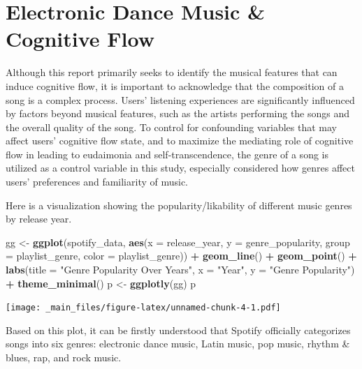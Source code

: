 \documentclass[
]{book}
\newenvironment{Shaded}{\begin{snugshade}}{\end{snugshade}}
\newcommand{\AttributeTok}[1]{\textcolor[rgb]{0.13,0.29,0.53}{#1}}
\newcommand{\FunctionTok}[1]{\textcolor[rgb]{0.13,0.29,0.53}{\textbf{#1}}}
\newcommand{\NormalTok}[1]{#1}
\newcommand{\OtherTok}[1]{\textcolor[rgb]{0.56,0.35,0.01}{#1}}
\newcommand{\SpecialCharTok}[1]{\textcolor[rgb]{0.81,0.36,0.00}{\textbf{#1}}}
\newcommand{\StringTok}[1]{\textcolor[rgb]{0.31,0.60,0.02}{#1}}
\begin{document}
\hypertarget{electronic-dance-music-cognitive-flow}{%
\chapter{Electronic Dance Music \& Cognitive Flow}\label{electronic-dance-music-cognitive-flow}}

Although this report primarily seeks to identify the musical features that can induce cognitive flow, it is important to acknowledge that the composition of a song is a complex process. Users' listening experiences are significantly influenced by factors beyond musical features, such as the artists performing the songs and the overall quality of the song. To control for confounding variables that may affect users' cognitive flow state, and to maximize the mediating role of cognitive flow in leading to eudaimonia and self-transcendence, the genre of a song is utilized as a control variable in this study, especially considered how genres affect users' preferences and familiarity of music.

Here is a visualization showing the popularity/likability of different music genres by release year.

\begin{Shaded}
\begin{Highlighting}[]
\NormalTok{gg }\OtherTok{\textless{}{-}} \FunctionTok{ggplot}\NormalTok{(spotify\_data, }\FunctionTok{aes}\NormalTok{(}\AttributeTok{x =}\NormalTok{ release\_year, }\AttributeTok{y =}\NormalTok{ genre\_popularity, }\AttributeTok{group =}\NormalTok{ playlist\_genre, }\AttributeTok{color =}\NormalTok{ playlist\_genre)) }\SpecialCharTok{+}
  \FunctionTok{geom\_line}\NormalTok{() }\SpecialCharTok{+} \FunctionTok{geom\_point}\NormalTok{() }\SpecialCharTok{+}
  \FunctionTok{labs}\NormalTok{(}\AttributeTok{title =} \StringTok{"Genre Popularity Over Years"}\NormalTok{, }\AttributeTok{x =} \StringTok{"Year"}\NormalTok{, }\AttributeTok{y =} \StringTok{"Genre Popularity"}\NormalTok{) }\SpecialCharTok{+}
  \FunctionTok{theme\_minimal}\NormalTok{()}
\NormalTok{p }\OtherTok{\textless{}{-}} \FunctionTok{ggplotly}\NormalTok{(gg)}
\NormalTok{p}
\end{Highlighting}
\end{Shaded}

\texttt{[image: \_main\_files/figure-latex/unnamed-chunk-4-1.pdf]}

Based on this plot, it can be firstly understood that Spotify officially categorizes songs into six genres: electronic dance music, Latin music, pop music, rhythm \& blues, rap, and rock music.
\end{document}
